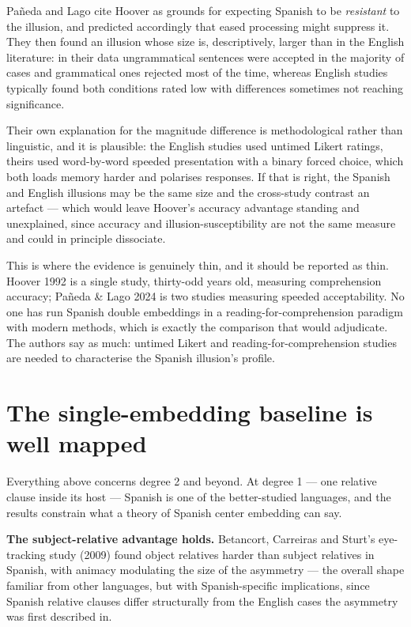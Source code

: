 \documentclass[11pt, a4paper]{article}
\begin{document}
Pañeda and Lago cite Hoover as grounds for expecting Spanish to be \emph{resistant} to the illusion, and predicted accordingly that eased processing might suppress it. They then found an illusion whose size is, descriptively, larger than in the English literature: in their data ungrammatical sentences were accepted in the majority of cases and grammatical ones rejected most of the time, whereas English studies typically found both conditions rated low with differences sometimes not reaching significance.

Their own explanation for the magnitude difference is methodological rather than linguistic, and it is plausible: the English studies used untimed Likert ratings, theirs used word-by-word speeded presentation with a binary forced choice, which both loads memory harder and polarises responses. If that is right, the Spanish and English illusions may be the same size and the cross-study contrast an artefact --- which would leave Hoover's accuracy advantage standing and unexplained, since accuracy and illusion-susceptibility are not the same measure and could in principle dissociate.

This is where the evidence is genuinely thin, and it should be reported as thin. Hoover 1992 is a single study, thirty-odd years old, measuring comprehension accuracy; Pañeda \& Lago 2024 is two studies measuring speeded acceptability. No one has run Spanish double embeddings in a reading-for-comprehension paradigm with modern methods, which is exactly the comparison that would adjudicate. The authors say as much: untimed Likert and reading-for-comprehension studies are needed to characterise the Spanish illusion's profile.

\section{The single-embedding baseline is well mapped}

Everything above concerns degree 2 and beyond. At degree 1 --- one relative clause inside its host --- Spanish is one of the better-studied languages, and the results constrain what a theory of Spanish center embedding can say.

\textbf{The subject-relative advantage holds.} Betancort, Carreiras and Sturt's eye-tracking study (2009) found object relatives harder than subject relatives in Spanish, with animacy modulating the size of the asymmetry --- the overall shape familiar from other languages, but with Spanish-specific implications, since Spanish relative clauses differ structurally from the English cases the asymmetry was first described in.
\end{document}
